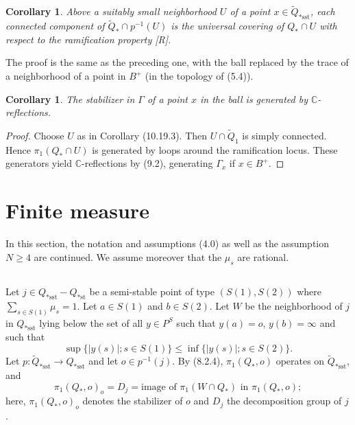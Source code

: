 \documentclass[12pt,a4paper]{article}
\theoremstyle{plain}
\newtheorem{corollary}[theorem]{Corollary}
\theoremstyle{definition}
\theoremstyle{remark}
\begin{document}
\begin{corollary}
\label{10.19.3}
Above a suitably small neighborhood $U$ of a point $x \in \widetilde{Q}_{*\text{sst}}$, each connected component of $\widetilde{Q}_* \cap p^{-1}(U)$ is the universal covering of $Q_* \cap U$ with respect to the ramification property [R].
\end{corollary}

The proof is the same as the preceding one, with the ball replaced by the trace of a neighborhood of a point in $B^+$ (in the topology of (5.4)).

\begin{corollary}
\label{10.19.4}
The stabilizer in $\Gamma$ of a point $x$ in the ball is generated by $\mathbb{C}$-reflections.
\end{corollary}

\begin{proof}
Choose $U$ as in Corollary (10.19.3). Then $U \cap \widetilde{Q}_1$ is simply connected. Hence $\pi_1(Q_* \cap U)$ is generated by loops around the ramification locus. These generators yield $\mathbb{C}$-reflections by (9.2), generating $\Gamma_x$ if $x \in B^+$.
\end{proof}

\section{Finite measure}
\label{sec:11}

In this section, the notation and assumptions (4.0) as well as the assumption $N \geqslant 4$ are continued. We assume moreover that the $\mu_s$ are rational.

\subsection{}
\label{11.1}

Let $j \in Q_{*\text{sst}} - Q_{*\text{st}}$ be a semi-stable point of type $(S(1), S(2))$ where $\sum_{s \in S(1)} \mu_s = 1$. Let $a \in S(1)$ and $b \in S(2)$. Let $W$ be the neighborhood of $j$ in $Q_{*\text{sst}}$ lying below the set of all $y \in P^S$ such that $y(a) = o$, $y(b) = \infty$ and such that
\[
\sup \{|y(s)|; s \in S(1)\} \leqslant \inf \{|y(s)|; s \in S(2)\}.
\]
Let $p : \widetilde{Q}_{*\text{sst}} \to Q_{*\text{sst}}$ and let $o \in p^{-1}(j)$. By (8.2.4), $\pi_1(Q_*, o)$ operates on $\widetilde{Q}_{*\text{sst}}$, and
\[
\pi_1(Q_*, o)_o = D_j = \text{image of } \pi_1(W \cap Q_*) \text{ in } \pi_1(Q_*, o);
\]
here, $\pi_1(Q_*, o)_o$ denotes the stabilizer of $o$ and $D_j$ the decomposition group of $j$.
\end{document}
